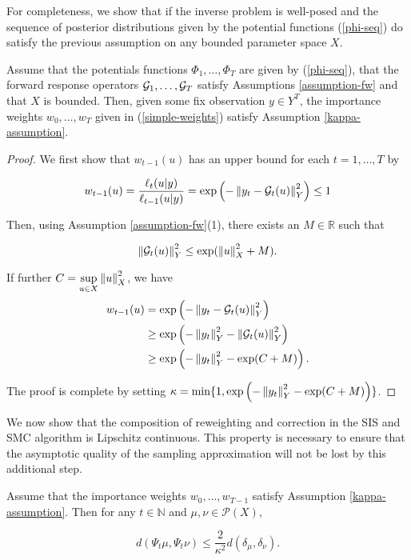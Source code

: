 For completeness, we show that if the inverse problem is well-posed and the sequence of posterior distributions given by the potential functions (\ref{phi-seq}) do satisfy the previous assumption on any bounded parameter space $X$.

\begin{lemma}\label{easy-lemma}
  Assume that the potentials functions $\Phi_1, \ldots, \Phi_T$ are given by (\ref{phi-seq}), that the forward response operators $\mathcal{G}_1, \ldots, \mathcal{G}_T$ satisfy Assumptions \ref{assumption-fw} and that $X$ is bounded. Then, given some fix observation $y \in Y^T$, the importance weights $w_0, \ldots, w_T$ given in (\ref{simple-weights}) satisfy Assumption \ref{kappa-assumption}.
\end{lemma}

\begin{proof}
  We first show that $w_{t-1}(u)$ has an upper bound for each $t = 1, \ldots, T$ by

  \begin{equation*}
    w_{t-1}(u)
    = \frac{\ell_t(u|y)}{\ell_{t-1}(u|y)}
    = \exp\left(-\left\lVert y_t - \mathcal{G}_t(u)\right\rVert_Y^2\right) \le 1
  \end{equation*}

  Then, using Assumption \ref{assumption-fw}(1), there exists an $M \in \mathbb{R}$ such that
  
  \begin{equation*}
    \left\lVert\mathcal{G}_t(u)\right\rVert_Y^2 \le \exp(\left\lVert u\right\rVert_X^2 + M).
  \end{equation*}

  If further $C = \underset{u \in X}{\sup} \left\lVert u\right\rVert_X^2$, we have
  \begin{align*}
    w_{t-1}(u)
    &= \exp\left(-\left\lVert y_t - \mathcal{G}_t(u)\right\rVert_Y^2\right)\\
    &\ge \exp\left(-\left\lVert y_t\right\rVert_Y^2 - \left\lVert\mathcal{G}_t(u)\right\rVert_Y^2\right)\\
    &\ge \exp\left(-\left\lVert y_t\right\rVert_Y^2 - \exp(C+M)\right).
  \end{align*}

  The proof is complete by setting $\kappa = \min\{1, \exp\left(-\left\lVert y_t\right\rVert_Y^2 - \exp(C+M)\right)\}$.
\end{proof}

We now show that the composition of reweighting and correction in the SIS and SMC algorithm is Lipschitz continuous. This property is necessary to ensure that the asymptotic quality of the sampling approximation will not be lost by this additional step.

\begin{lemma} \label{seq-bound}
  Assume that the importance weights $w_0, \ldots, w_{T-1}$ satisfy Assumption \ref{kappa-assumption}. Then for any $t \in \mathbb{N}$ and $\mu, \nu \in \mathcal{P}(X)$,

  \begin{equation*}
    d(\Psi_t\mu, \Psi_t\nu) \leq \frac2{\kappa^2}d(\delta_\mu, \delta_\nu).
  \end{equation*}
\end{lemma}

